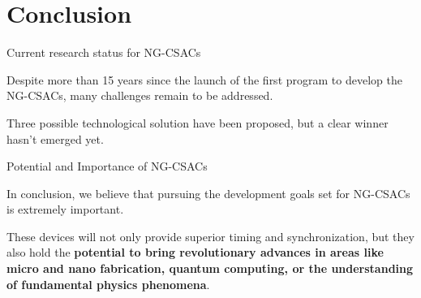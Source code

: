 \section{Conclusion}

\begin{frame}{Current research status for NG-CSACs}

    Despite more than 15 years since the launch of the first program to develop the NG-CSACs, many challenges remain to be addressed.

    \vspace{10pt}

    Three possible technological solution have been proposed, but a clear winner hasn't emerged yet.

\end{frame}



\begin{frame}{Potential and Importance of NG-CSACs}

    In conclusion, we believe that pursuing the development goals set for NG-CSACs is extremely important.

    \vspace{10pt}

    These devices will not only provide superior timing and synchronization, but they also hold the \textbf{potential to bring revolutionary advances in areas like micro and nano fabrication, quantum computing, or the understanding of fundamental physics phenomena}.

\end{frame}